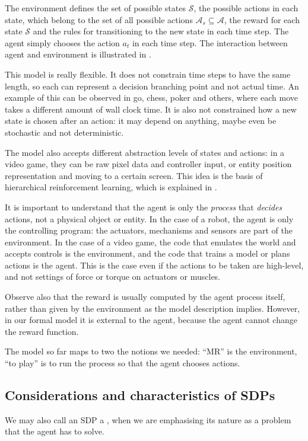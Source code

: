 The environment defines the set of possible states $\mathcal{S}$, the possible
actions in each state, which belong to the set of all possible actions
$\mathcal{A}_s \subseteq \mathcal{A}$, the reward for each state $\mathcal{S}$
and the rules for transitioning to the new state in each time step. The agent
simply chooses the action $a_t$ in each time step. The interaction between agent
and environment is illustrated in .


This model is really flexible. It does not constrain time steps to have the same
length, so each can represent a decision branching point and not actual time. An
example of this can be observed in go, chess, poker and others, where each move
takes a different amount of wall clock time. It is also not constrained how a new
state is chosen after an action: it may depend on anything, maybe even be
stochastic and not deterministic.

The model also accepts different abstraction levels of states and actions: in a
video game, they can be raw pixel data and controller input, or entity position
representation and moving to a certain screen. This idea is the basis of
hierarchical reinforcement learning, which is explained in
.

It is important to understand that the agent is only the \emph{process} that
\emph{decides} actions, not a physical object or entity. In the case of a robot, the
agent is only the controlling program: the actuators, mechanisms and sensors are part
of the environment. In the case of a video game, the code that emulates
the world and accepts controls is the environment, and the code that trains a
model or plans actions is the agent. This is the case even if the actions to be
taken are high-level, and not settings of force or torque on actuators or
muscles.

Observe also that the reward is usually computed by the agent process itself,
rather than given by the environment as the model description implies. However,
in our formal model it is external to the agent, because the agent cannot change
the reward function.

The model so far maps to two the notions we needed: ``\acl{MR}'' is the environment,
``to play'' is to run the process so that the agent chooses actions.
\subsection{Considerations and characteristics of \acp{SDP}\label{subsec:considerations-sdp}}
We may also call an \ac{SDP} a , when we are emphasising its nature
as a problem that the agent has to solve.

